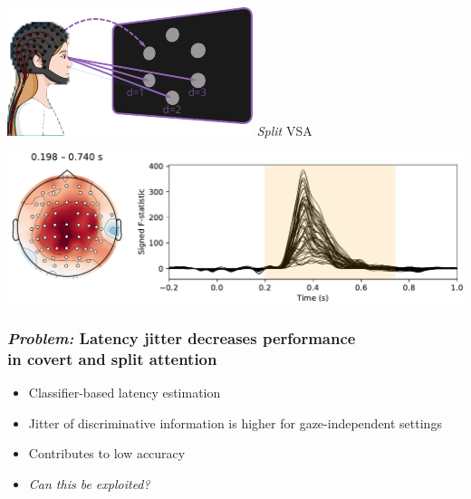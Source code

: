 \documentclass{kul-ulille-beamer}
\begin{document}
\begin{frame}
\begin{minipage}[t]{.45\textwidth}
    \includegraphics[width=.2\textwidth]{figures/covert/attention_split.pdf}
    \hspace{.5em}
    \emph{Split} VSA
    \smallskip

    \includegraphics[width=\textwidth]{figures/covert/erps/erp_split_cluster-0.pdf}

  \end{minipage}
\end{frame}




\begin{frame}[c]
  \frametitle{\emph{Problem:} Latency jitter decreases performance \\ in covert and split
  attention}
  \begin{minipage}{.4\textwidth}
    
  \end{minipage}\hfill%
  \begin{minipage}{.55\textwidth}
    \small
    \centering
    {\centering\resizebox{.7\textwidth}{!}{%
    \small

    
    }}
    \smallskip

    \begin{itemize}
      \item Classifier-based latency estimation {\tiny\cite{Mowla2017}}
      \item Jitter of discriminative information is higher
        for gaze-independent settings
      \item Contributes to low accuracy {\tiny\cite{Arico2014}}
      \item \emph{Can this be exploited?}
    \end{itemize}

  \end{minipage}

\end{frame}
\end{document}
